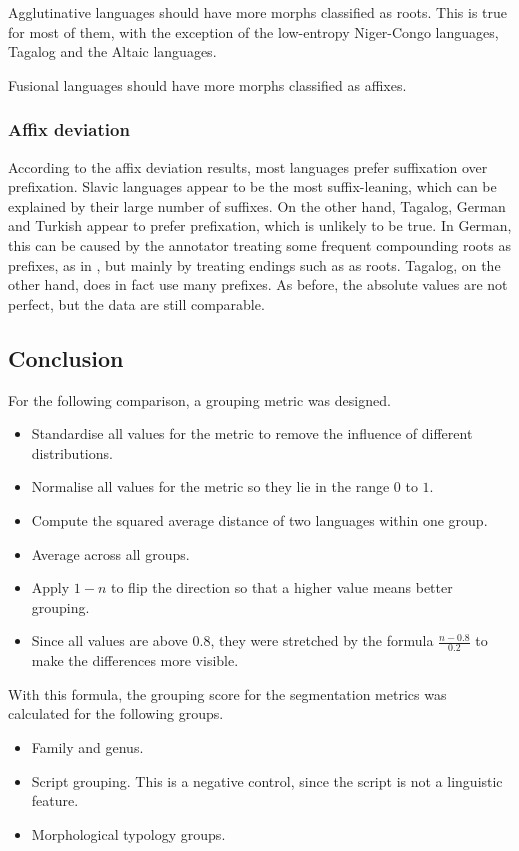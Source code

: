 Agglutinative languages should have more morphs classified as roots. This is true for most of them, with the exception of the low-entropy Niger-Congo languages, Tagalog and the Altaic languages.

Fusional languages should have more morphs classified as affixes.



\subsubsection{Affix deviation}

According to the affix deviation results, most languages prefer suffixation over prefixation. Slavic languages appear to be the most suffix-leaning, which can be explained by their large number of suffixes. On the other hand, Tagalog, German and Turkish appear to prefer prefixation, which is unlikely to be true. In German, this can be caused by the annotator treating some frequent compounding roots as prefixes, as in , but mainly by treating endings such as  as roots. Tagalog, on the other hand, does in fact use many prefixes. As before, the absolute values are not perfect, but the data are still comparable.

\subsection{Conclusion}

For the following comparison, a grouping metric was designed.

\begin{itemize}
    \item Standardise all values for the metric to remove the influence of different distributions.
    \item Normalise all values for the metric so they lie in the range $0$ to $1$.
    \item Compute the squared average distance of two languages within one group.
    \item Average across all groups.
    \item Apply $1-n$ to flip the direction so that a higher value means better grouping.
    \item Since all values are above $0.8$, they were stretched by the formula $\frac{n-0.8}{0.2}$ to make the differences more visible.
\end{itemize}

With this formula, the grouping score for the segmentation metrics was calculated for the following groups.
\begin{itemize}
    \item Family and genus.
    \item Script grouping. This is a negative control, since the script is not a linguistic feature.
    \item Morphological typology groups.
\end{itemize}

